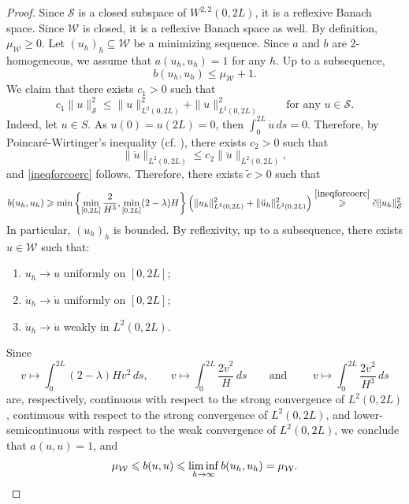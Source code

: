 \documentclass[11pt]{amsart}
\renewcommand{\leq}{\leqslant}
\renewcommand{\geq}{\geqslant}
\theoremstyle{definition}
\theoremstyle{remark}
\numberwithin{equation}{section}
\begin{document}
\begin{proof}
Since $\mathcal S$ is a closed subspace of $W^{2,2}(0,2L)$, it is a reflexive Banach space. Since $\mathcal W$ is closed, it is a reflexive Banach space as well.  By definition, $\mu_{\mathcal W}\geq 0$. Let $(u_h)_h\subseteq \mathcal W$ be a minimizing sequence. Since $a$ and $b$ are $2$-homogeneous, we assume that $a(u_h,u_h)=1$ for any $h$. Up to a subsequence, 
\begin{equation*}
	b(u_h,u_h)\leq \mu_{\mathcal W}+1.
\end{equation*}
We claim that there exists $c_1>0$ such that
\begin{equation}\label{ineqforcoerc}
	c_1\|u\|^2_\mathcal S\leq \|u\|^2_{L^2(0,2L)}+\|\ddot u\|^2_{L^2(0,2L)}\qquad\text{  for any $u\in \mathcal S$.}
\end{equation}
Indeed, let $u\in S$. As $u(0)=u(2L)=0$, then $\int_0^{2L}\dot u\,ds=0$. Therefore, by Poincaré-Wirtinger's inequality (cf. \cite{MR2759829}), there exists $c_2>0$ such that
\begin{equation*}
	\|\dot u\|_{L^2(0,2L)}\leq c_2\|\ddot u\|_{L^2(0,2L)},
\end{equation*}
and \eqref{ineqforcoerc} follows.
Therefore, there exists $\tilde c>0$ such that
\begin{equation*}
	b(u_h,u_h)\geq \min\left\{\min_{[0,2L]}\frac{2}{H^3},\min_{[0,2L]}(2-\lambda)H\right\}\left(\|u_h\|^2_{L^2(0,2L)}+\|\ddot u_h\|^2_{L^2(0,2L)}\right)\overset{\eqref{ineqforcoerc}}{\geq} \tilde c\|u_h\|^2_\mathcal S
\end{equation*}
In particular, $(u_h)_h$ is bounded. By reflexivity, up to a subsequence, there exists $u\in \mathcal W$ such that:
\begin{enumerate}
	\item [(i)]$u_h\to u$ uniformly on $[0,2L]$;
	\item [(ii)]$\dot u_h\to \dot u$ uniformly on $[0,2L]$;
	\item [(iii)]$\ddot u_h\to \ddot u$ weakly in $L^2(0,2L)$.
\end{enumerate}
Since 
\begin{equation*}
	v\mapsto\int_0^{2L}(2-\lambda)H v^2\,ds,\qquad v\mapsto\int_0^{2L}\frac{2\dot v^2}{H}\,ds\qquad\text{and }\qquad v\mapsto\int_0^{2L}\frac{2\ddot v^2}{H^3}\,ds
\end{equation*}
are, respectively, continuous with respect to the strong convergence of $L^2(0,2L)$, continuous with respect to the strong convergence of $L^2(0,2L)$, and lower-semicontinuous with respect to the weak convergence of $L^2(0,2L)$, we conclude that $a(u,u)=1$, and
\begin{equation*}
	\mu_{\mathcal W}\leq b(u,u)\leq\liminf_{h\to\infty}b(u_h,u_h)=\mu_{\mathcal W}.\qedhere
\end{equation*}
\end{proof}
\end{document}

